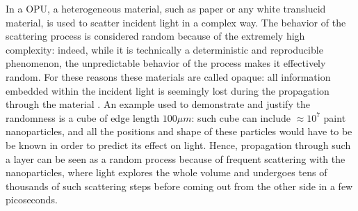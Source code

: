 In a OPU, a heterogeneous material, such as paper or any white translucid material, is used to scatter incident light in a complex way. The behavior of the scattering process is considered random because of the extremely high complexity: indeed, while it is technically a deterministic and reproducible phenomenon, the unpredictable behavior of the process makes it effectively random. For these reasons these materials are called opaque: all information embedded within the incident light is seemingly lost during the propagation through the material \citep{saade_opu}. An example used to demonstrate and justify the randomness is a cube of edge length $100\mu m$: such cube can include $\approx 10^7$ paint nanoparticles, and all the positions and shape of these particles would have to be be known in order to predict its effect on light. Hence, propagation through such a layer can be seen as a random process because of frequent scattering with the nanoparticles, where light explores the whole volume and undergoes tens of thousands of such scattering steps before coming out from the other side in a few picoseconds.

